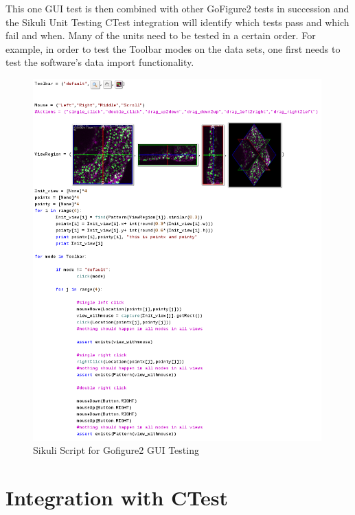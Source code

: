 \documentclass{InsightArticle}
\begin{document}
This one GUI test is then combined with other GoFigure2 tests in succession and
the Sikuli Unit Testing CTest integration will identify which tests pass and
which fail and when. Many of the units need to be tested in a certain order.
For example, in order to test the Toolbar modes on the data sets, one first
needs to test the software's data import functionality.

\begin{figure}[tbp]
 \centering
 \includegraphics[width=0.99\textwidth]{Images/Gofigure2Example.png}
 \caption{Sikuli Script for Gofigure2 GUI Testing}
 \label{fig:Gofigure2Example}
\end{figure}

\section{Integration with CTest}
\label{sec:IntegrationWithCTest}
\end{document}
